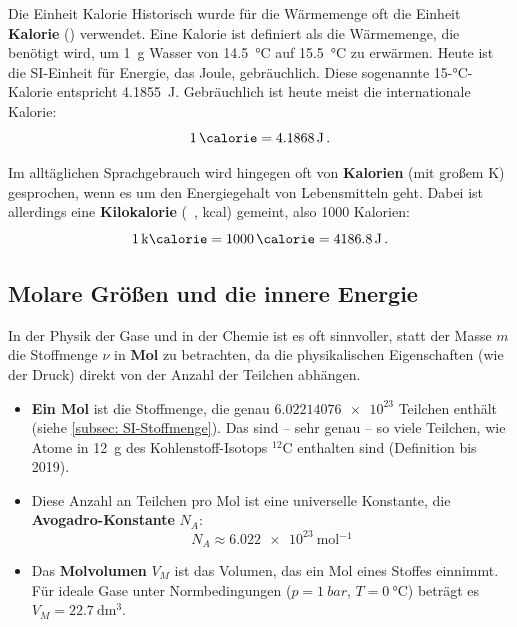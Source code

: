 \begin{rememberbox}{Die Einheit Kalorie}
    Historisch wurde für die Wärmemenge oft die Einheit \textbf{Kalorie} (\si{\calorie}) verwendet.
    Eine Kalorie ist definiert als die Wärmemenge, die benötigt wird, um \SI{1}{\gram} Wasser von \SI{14.5}{\celsius} auf \SI{15.5}{\celsius} zu erwärmen.
    Heute ist die SI-Einheit für Energie, das Joule, gebräuchlich. Diese sogenannte 15-\si{\celsius}-Kalorie entspricht \SI{4.1855}{\joule}. Gebräuchlich ist heute meist die internationale Kalorie:
    \begin{equation}
        \SI{1}{\calorie} = \SI{4.1868}{\joule} \mDot
    \end{equation}
\end{rememberbox}
Im alltäglichen Sprachgebrauch wird hingegen oft von \textbf{Kalorien} (mit großem K) gesprochen, wenn es um den Energiegehalt von Lebensmitteln geht. Dabei ist allerdings eine \textbf{Kilokalorie} (\si{\kilo\calorie}, kcal) gemeint, also \num{1000} Kalorien: 
\begin{equation}
    \SI{1}{\kilo\calorie} = \SI{1000}{\calorie} = \SI{4186.8}{\joule} \mDot
\end{equation}

\subsection{Molare Größen und die innere Energie}\label{subsec: molare_groessen_innere_energie}
In der Physik der Gase und in der Chemie ist es oft sinnvoller, statt der Masse $m$ die Stoffmenge $\nu$ in \textbf{Mol} zu betrachten, da die physikalischen Eigenschaften (wie der Druck) direkt von der Anzahl der Teilchen abhängen.
\begin{itemize}
    \item \textbf{Ein Mol} ist die Stoffmenge, die genau $\num{6.02214076e23}$ Teilchen enthält (siehe \cref{subsec: SI-Stoffmenge}). Das sind -- sehr genau -- so viele Teilchen, wie Atome in \SI{12}{\gram} des Kohlenstoff-Isotops ${}^{12}\mathrm{C}$ enthalten sind (Definition bis 2019).
    \item Diese Anzahl an Teilchen pro Mol ist eine universelle Konstante, die \textbf{Avogadro-Konstante} $N_A$:
    \begin{equation}
        N_A \approx \SI{6.022e23}{\mol^{-1}}
    \end{equation}
    \item Das \textbf{Molvolumen} $V_M$ ist das Volumen, das ein Mol eines Stoffes einnimmt. Für ideale Gase unter Normbedingungen ($p=\SI{1}{bar}$, $T=\SI{0}{\celsius}$) beträgt es $V_M = \SI{22.7}{\deci\meter\cubed}$.
\end{itemize}

